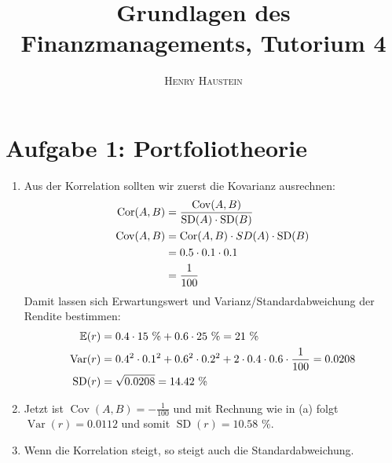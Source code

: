 \documentclass{article}
\title{\textbf{Grundlagen des Finanzmanagements, Tutorium 4}}
\author{\textsc{Henry Haustein}}
\date{}
\newcommand{\E}{\mathbb{E}}
\DeclareMathOperator{\Var}{Var}
\DeclareMathOperator{\Cov}{Cov}
\DeclareMathOperator{\Cor}{Cor}
\DeclareMathOperator{\SD}{SD}
\begin{document}
	\maketitle
	
	\section*{Aufgabe 1: Portfoliotheorie}
	\begin{enumerate}[label=(\alph*)]
		\item Aus der Korrelation sollten wir zuerst die Kovarianz ausrechnen:
		\begin{align}
			\Cor(A,B) &= \frac{\Cov(A,B)}{\SD(A)\cdot \SD(B)} \notag \\
			\Cov(A,B) &= \Cor(A,B) \cdot SD(A)\cdot \SD(B) \notag \\
			&= 0.5\cdot 0.1\cdot 0.1 \notag \\
			&= \frac{1}{100} \notag
		\end{align}
		Damit lassen sich Erwartungswert und Varianz/Standardabweichung der Rendite bestimmen:
		\begin{align}
			\E(r) &= 0.4\cdot 15\text{ \%} + 0.6\cdot 25\text{ \%} = 21\text{ \%} \notag \\
			\Var(r) &= 0.4^2\cdot 0.1^2 + 0.6^2\cdot 0.2^2 + 2\cdot 0.4\cdot 0.6\cdot \frac{1}{100} = 0.0208 \notag \\
			\SD(r) &= \sqrt{0.0208} = 14.42\text{ \%} \notag
		\end{align}
		\item Jetzt ist $\Cov(A,B)=-\frac{1}{100}$ und mit Rechnung wie in (a) folgt $\Var(r)=0.0112$ und somit $\SD(r)=10.58$ \%.
		\item Wenn die Korrelation steigt, so steigt auch die Standardabweichung.
	\end{enumerate}
	
\end{document}
